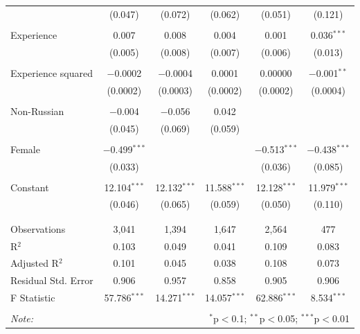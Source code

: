 \documentclass[12pt,a4paper]{article}
\begin{document}
\begin{Schunk}
\begin{table}[!htbp]
\begin{tabular}{@{\extracolsep{5pt}}lccccc}
  & (0.047) & (0.072) & (0.062) & (0.051) & (0.121) \\ 
  & & & & & \\ 
 Experience & 0.007 & 0.008 & 0.004 & 0.001 & 0.036$^{***}$ \\ 
  & (0.005) & (0.008) & (0.007) & (0.006) & (0.013) \\ 
  & & & & & \\ 
 Experience squared & $-$0.0002 & $-$0.0004 & 0.0001 & 0.00000 & $-$0.001$^{**}$ \\ 
  & (0.0002) & (0.0003) & (0.0002) & (0.0002) & (0.0004) \\ 
  & & & & & \\ 
 Non-Russian & $-$0.004 & $-$0.056 & 0.042 &  &  \\ 
  & (0.045) & (0.069) & (0.059) &  &  \\ 
  & & & & & \\ 
 Female & $-$0.499$^{***}$ &  &  & $-$0.513$^{***}$ & $-$0.438$^{***}$ \\ 
  & (0.033) &  &  & (0.036) & (0.085) \\ 
  & & & & & \\ 
 Constant & 12.104$^{***}$ & 12.132$^{***}$ & 11.588$^{***}$ & 12.128$^{***}$ & 11.979$^{***}$ \\ 
  & (0.046) & (0.065) & (0.059) & (0.050) & (0.110) \\ 
  & & & & & \\ 
\hline \\[-1.8ex] 
Observations & 3,041 & 1,394 & 1,647 & 2,564 & 477 \\ 
R$^{2}$ & 0.103 & 0.049 & 0.041 & 0.109 & 0.083 \\ 
Adjusted R$^{2}$ & 0.101 & 0.045 & 0.038 & 0.108 & 0.073 \\ 
Residual Std. Error & 0.906 & 0.957 & 0.858 & 0.905 & 0.906 \\ 
F Statistic & 57.786$^{***}$ & 14.271$^{***}$ & 14.057$^{***}$ & 62.886$^{***}$ & 8.534$^{***}$ \\ 
\hline 
\hline \\[-1.8ex] 
\textit{Note:}  & \multicolumn{5}{r}{$^{*}$p$<$0.1; $^{**}$p$<$0.05; $^{***}$p$<$0.01} \\ 
\end{tabular} 
\end{table} 

\newpage


\end{Schunk}
\end{document}
